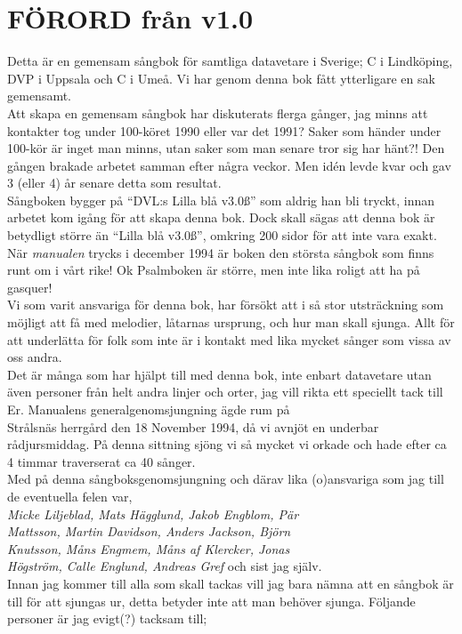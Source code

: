 \documentclass[a6paper,fontsize=10pt,twoside,openright]{scrbook}
\begin{document}
\section{FÖRORD från v1.0}\vspace{10pt}
\hspace{\indent}Detta är en gemensam sångbok för samtliga datavetare
i Sverige; C i Lindköping, DVP i Uppsala och C i Umeå. Vi har genom
denna bok fått ytterligare en sak gemensamt.\\ \indent Att skapa en
gemensam sångbok har diskuterats flerga gånger, jag minns att
kontakter tog under 100-köret 1990 eller var det 1991?  Saker som
händer under 100-kör är inget man minns, utan saker som man senare
tror sig har hänt?! Den gången brakade arbetet samman efter några
veckor. Men idén levde kvar och gav 3 (eller 4) år senare detta som
resultat.\\ \indent Sångboken bygger på ``DVL:s Lilla blå v3.0\ss''
som aldrig han bli tryckt, innan arbetet kom igång för att skapa denna
bok. Dock skall sägas att denna bok är betydligt större än ``Lilla blå
v3.0\ss'', omkring 200 sidor för att inte vara exakt.\\ \indent När
\textit{manualen} trycks i december 1994 är boken den största sångbok
som finns runt om i vårt rike! Ok Psalmboken är större, men inte lika
roligt att ha på gasquer!\\ \indent Vi som varit ansvariga för denna
bok, har försökt att i så stor utsträckning som möjligt att få med
melodier, låtarnas ursprung, och hur man skall sjunga. Allt för att
underlätta för folk som inte är i kontakt med lika mycket sånger som
vissa av oss andra.\\ \indent Det är många som har hjälpt till med
denna bok, inte enbart datavetare utan även personer från helt andra
linjer och orter, jag vill rikta ett speciellt tack till Er.
\newpage
\indent Manualens generalgenomsjungning ägde rum på\\ Strålsnäs
herrgård den 18 November 1994, då vi avnjöt en underbar
rådjursmiddag. På denna sittning sjöng vi så mycket vi orkade och hade
efter ca 4 timmar traverserat ca 40 sånger.\\ \indent Med på denna
sångboksgenomsjungning och därav lika (o)ansvariga som jag till de
eventuella felen var,\\ \textit{Micke Liljeblad, Mats Hägglund, Jakob
  Engblom, Pär\\ Mattsson, Martin Davidson, Anders Jackson,
  Björn\\ Knutsson, Måns Engmem, Måns af Klercker, Jonas\\ Högström,
  Calle Englund, Andreas Gref} och sist jag själv.\\ \indent Innan jag
kommer till alla som skall tackas vill jag bara nämna att en sångbok
är till för att sjungas ur, detta betyder inte att man behöver
sjunga. Följande personer är jag evigt(?)  tacksam till;\\
\end{document}

